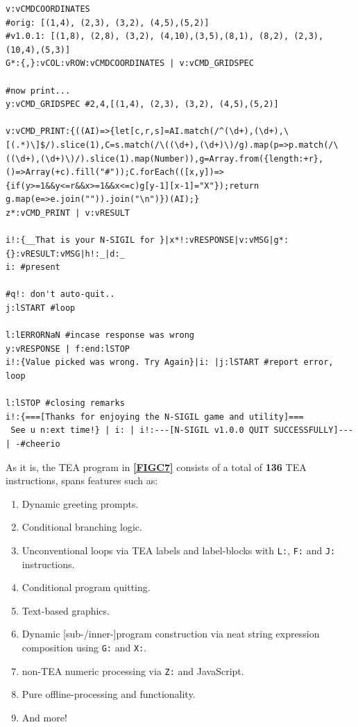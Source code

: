 \documentclass[a4paper, 18pt]{book} %
\begin{document}
\begin{tcolorbox}[teaterminalstyle, title=TEA Program: N-SIGIL image generator program, breakable]
\begin{lstlisting}[language=TEA,breaklines=true]
v:vCMDCOORDINATES
#orig: [(1,4), (2,3), (3,2), (4,5),(5,2)]
#v1.0.1: [(1,8), (2,8), (3,2), (4,10),(3,5),(8,1), (8,2), (2,3), (10,4),(5,3)]
G*:{,}:vCOL:vROW:vCMDCOORDINATES | v:vCMD_GRIDSPEC

#now print...
y:vCMD_GRIDSPEC #2,4,[(1,4), (2,3), (3,2), (4,5),(5,2)]

v:vCMD_PRINT:{((AI)=>{let[c,r,s]=AI.match(/^(\d+),(\d+),\[(.*)\]$/).slice(1),C=s.match(/\((\d+),(\d+)\)/g).map(p=>p.match(/\((\d+),(\d+)\)/).slice(1).map(Number)),g=Array.from({length:+r},()=>Array(+c).fill("#"));C.forEach(([x,y])=>{if(y>=1&&y<=r&&x>=1&&x<=c)g[y-1][x-1]="X"});return g.map(e=>e.join("")).join("\n")})(AI);}
z*:vCMD_PRINT | v:vRESULT

i!:{__That is your N-SIGIL for }|x*!:vRESPONSE|v:vMSG|g*:{}:vRESULT:vMSG|h!:_|d:_
i: #present

#q!: don't auto-quit..
j:lSTART #loop

l:lERRORNaN #incase response was wrong
y:vRESPONSE | f:end:lSTOP
i!:{Value picked was wrong. Try Again}|i: |j:lSTART #report error, loop

l:lSTOP #closing remarks
i!:{===[Thanks for enjoying the N-SIGIL game and utility]===
 See u n:ext time!} | i: | i!:---[N-SIGIL v1.0.0 QUIT SUCCESSFULLY]--- | -#cheerio
   \end{lstlisting}
  \end{tcolorbox}
  \label{FIGC7}
  \vspace{1cm}
  
  
  As it is, the TEA program in \textbf{\autoref{FIGC7}} consists of a total of \textbf{136} TEA instructions, spans features such as:
  
\begin{enumerate}
\item Dynamic greeting prompts.
\item Conditional branching logic.
\item Unconventional loops via TEA labels and label-blocks with \texttt{L:}, \texttt{F:} and \texttt{J:} instructions.
\item Conditional program quitting.
\item Text-based graphics.
\item Dynamic [sub-/inner-]program construction via neat string expression composition using \texttt{G:} and \texttt{X:}.
\item non-TEA numeric processing via \texttt{Z:} and JavaScript.
\item Pure offline-processing and functionality.
\item And more!
\end{enumerate} 
 
\end{document}

